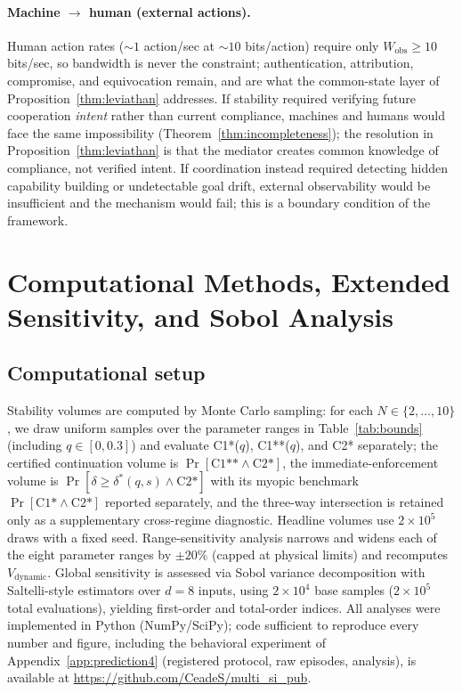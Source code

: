 \documentclass[manuscript,screen,review]{jair}
\begin{document}
\paragraph{Machine $\to$ human (external actions).}
Human action rates ($\sim 1$ action/sec at $\sim 10$ bits/action) require only $W_{\mathrm{obs}} \geq 10$ bits/sec, so bandwidth is never the constraint; authentication, attribution, compromise, and equivocation remain, and are what the common-state layer of Proposition~\ref{thm:leviathan} addresses. If stability required verifying future cooperation \emph{intent} rather than current compliance, machines and humans would face the same impossibility (Theorem~\ref{thm:incompleteness}); the resolution in Proposition~\ref{thm:leviathan} is that the mediator creates common knowledge of compliance, not verified intent. If coordination instead required detecting hidden capability building or undetectable goal drift, external observability would be insufficient and the mechanism would fail; this is a boundary condition of the framework.

\section{Computational Methods, Extended Sensitivity, and Sobol Analysis}
\label{app:sensitivity}

\subsection{Computational setup}
Stability volumes are computed by Monte Carlo sampling: for each $N \in \{2,\ldots,10\}$, we draw uniform samples over the parameter ranges in Table~\ref{tab:bounds} (including $q \in [0,0.3]$) and evaluate C1*($q$), C1**($q$), and C2* separately; the certified continuation volume is $\Pr[\text{C1**} \land \text{C2*}]$, the immediate-enforcement volume is $\Pr[\delta \geq \delta^*(q,s) \land \text{C2*}]$ with its myopic benchmark $\Pr[\text{C1*} \land \text{C2*}]$ reported separately, and the three-way intersection is retained only as a supplementary cross-regime diagnostic. Headline volumes use $2 \times 10^5$ draws with a fixed seed. Range-sensitivity analysis narrows and widens each of the eight parameter ranges by $\pm 20\%$ (capped at physical limits) and recomputes $V_{\mathrm{dynamic}}$. Global sensitivity is assessed via Sobol variance decomposition \cite{sobol.1993,saltelli.2002} with Saltelli-style estimators over $d{=}8$ inputs, using $2 \times 10^4$ base samples ($2 \times 10^5$ total evaluations), yielding first-order and total-order indices. All analyses were implemented in Python (NumPy/SciPy); code sufficient to reproduce every number and figure, including the behavioral experiment of Appendix~\ref{app:prediction4} (registered protocol, raw episodes, analysis), is available at \url{https://github.com/CeadeS/multi_si_pub}.
\end{document}
